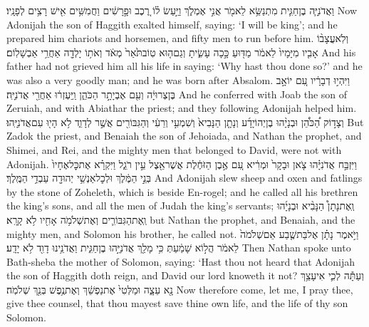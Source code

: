 {וַאֲדֹנִיָּ֧ה בֶן\maqqaf חַגִּ֛ית מִתְנַשֵּׂ֥א לֵאמֹ֖ר אֲנִ֣י אֶמְלֹ֑ךְ וַיַּ֣עַשׂ ל֗וֹ רֶ֚כֶב וּפָ֣רָשִׁ֔ים וַחֲמִשִּׁ֥ים אִ֖ישׁ רָצִ֥ים לְפָנָֽיו׃}
{Now Adonijah the son of Haggith exalted himself, saying: ‘I will be king’; and he prepared him chariots and horsemen, and fifty men to run before him.}
{וְלֹֽא\maqqaf עֲצָב֨וֹ אָבִ֤יו מִיָּמָיו֙ לֵאמֹ֔ר מַדּ֖וּעַ כָּ֣כָה עָשִׂ֑יתָ וְגַם\maqqaf ה֤וּא טֽוֹב\maqqaf תֹּ֙אַר֙ מְאֹ֔ד וְאֹת֥וֹ יָלְדָ֖ה אַחֲרֵ֥י אַבְשָׁלֽוֹם׃}
{And his father had not grieved him all his life in saying: ‘Why hast thou done so?’ and he was also a very goodly man; and he was born after Absalom.}
{וַיִּהְי֣וּ דְבָרָ֔יו עִ֚ם יוֹאָ֣ב בֶּן\maqqaf צְרוּיָ֔ה וְעִ֖ם אֶבְיָתָ֣ר הַכֹּהֵ֑ן וַֽיַּעְזְר֔וּ אַחֲרֵ֖י אֲדֹנִיָּֽה׃}
{And he conferred with Joab the son of Zeruiah, and with Abiathar the priest; and they following Adonijah helped him.}
{וְצָד֣וֹק הַ֠כֹּהֵ֠ן וּבְנָיָ֨הוּ בֶן\maqqaf יְהוֹיָדָ֜ע וְנָתָ֤ן הַנָּבִיא֙ וְשִׁמְעִ֣י וְרֵעִ֔י וְהַגִּבּוֹרִ֖ים אֲשֶׁ֣ר לְדָוִ֑ד לֹ֥א הָי֖וּ עִם\maqqaf אֲדֹנִיָּֽהוּ׃}
{But Zadok the priest, and Benaiah the son of Jehoiada, and Nathan the prophet, and Shimei, and Rei, and the mighty men that belonged to David, were not with Adonijah.}
{וַיִּזְבַּ֣ח אֲדֹנִיָּ֗הוּ צֹ֤אן וּבָקָר֙ וּמְרִ֔יא עִ֚ם אֶ֣בֶן הַזֹּחֶ֔לֶת אֲשֶׁר\maqqaf אֵ֖צֶל עֵ֣ין רֹגֵ֑ל וַיִּקְרָ֗א אֶת\maqqaf כׇּל\maqqaf אֶחָיו֙ בְּנֵ֣י הַמֶּ֔לֶךְ וּלְכׇל\maqqaf אַנְשֵׁ֥י יְהוּדָ֖ה עַבְדֵ֥י הַמֶּֽלֶךְ׃}
{And Adonijah slew sheep and oxen and fatlings by the stone of Zoheleth, which is beside En-rogel; and he called all his brethren the king’s sons, and all the men of Judah the king’s servants;}
{וְֽאֶת\maqqaf נָתָן֩ הַנָּבִ֨יא וּבְנָיָ֜הוּ וְֽאֶת\maqqaf הַגִּבּוֹרִ֛ים וְאֶת\maqqaf שְׁלֹמֹ֥ה אָחִ֖יו לֹ֥א קָרָֽא׃}
{but Nathan the prophet, and Benaiah, and the mighty men, and Solomon his brother, he called not.}
{וַיֹּ֣אמֶר נָתָ֗ן אֶל\maqqaf בַּת\maqqaf שֶׁ֤בַע אֵם\maqqaf שְׁלֹמֹה֙ לֵאמֹ֔ר הֲל֣וֹא שָׁמַ֔עַתְּ כִּ֥י מָלַ֖ךְ אֲדֹנִיָּ֣הוּ בֶן\maqqaf חַגִּ֑ית וַאֲדֹנֵ֥ינוּ דָוִ֖ד לֹ֥א יָדָֽע׃}
{Then Nathan spoke unto Bath-sheba the mother of Solomon, saying: ‘Hast thou not heard that Adonijah the son of Haggith doth reign, and David our lord knoweth it not?}
{וְעַתָּ֕ה לְכִ֛י אִיעָצֵ֥ךְ נָ֖א עֵצָ֑ה וּמַלְּטִי֙ אֶת\maqqaf נַפְשֵׁ֔ךְ וְאֶת\maqqaf נֶ֥פֶשׁ בְּנֵ֖ךְ שְׁלֹמֹֽה׃}
{Now therefore come, let me, I pray thee, give thee counsel, that thou mayest save thine own life, and the life of thy son Solomon.}
